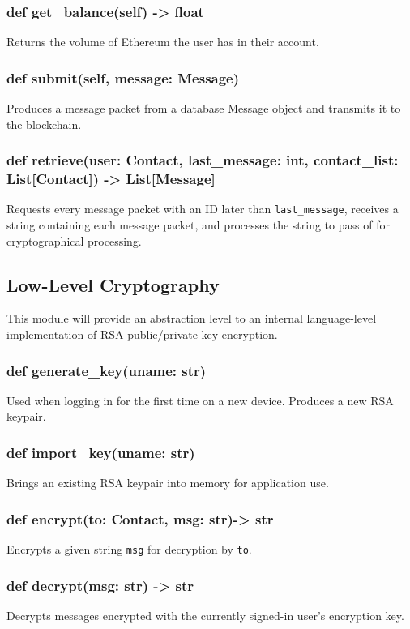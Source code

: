 \documentclass[titlepage]{report}
\begin{document}
\subsubsection{def get\_balance(self) -> float}
Returns the volume of Ethereum the user has in their account.
\subsubsection{def submit(self, message: Message)}
Produces a message packet from a database Message object and transmits it to the \gls{blockchain}.
\subsubsection{def retrieve(user: Contact, last\_message: int, contact\_list: List[Contact]) -> List[Message]}
Requests every message packet with an ID later than \texttt{last\_message}, receives a string containing each message packet, and processes the string to pass of for cryptographical processing.

\subsection{Low-Level Cryptography}
This module will provide an abstraction level to an internal language-level implementation of RSA public/private key encryption.

\subsubsection{def generate\_key(uname: str)}
Used when logging in for the first time on a new device. Produces a new RSA keypair.
\subsubsection{def import\_key(uname: str)}
Brings an existing RSA keypair into memory for application use.
\subsubsection{def encrypt(to: Contact, msg: str)-> str}
Encrypts a given string \texttt{msg} for decryption by \texttt{to}.
\subsubsection{def decrypt(msg: str) -> str}
Decrypts messages encrypted with the currently signed-in user's encryption key.
\end{document}
